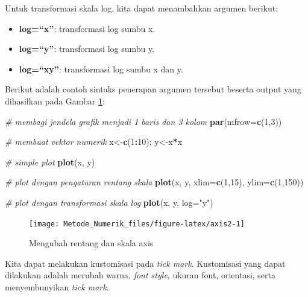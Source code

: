 \documentclass[]{book}
\newenvironment{Shaded}{\begin{snugshade}}{\end{snugshade}}
\newcommand{\CommentTok}[1]{\textcolor[rgb]{0.56,0.35,0.01}{\textit{#1}}}
\newcommand{\DataTypeTok}[1]{\textcolor[rgb]{0.13,0.29,0.53}{#1}}
\newcommand{\DecValTok}[1]{\textcolor[rgb]{0.00,0.00,0.81}{#1}}
\newcommand{\KeywordTok}[1]{\textcolor[rgb]{0.13,0.29,0.53}{\textbf{#1}}}
\newcommand{\NormalTok}[1]{#1}
\newcommand{\OperatorTok}[1]{\textcolor[rgb]{0.81,0.36,0.00}{\textbf{#1}}}
\newcommand{\StringTok}[1]{\textcolor[rgb]{0.31,0.60,0.02}{#1}}
\providecommand{\tightlist}{%
  \setlength{\itemsep}{0pt}\setlength{\parskip}{0pt}}
\theoremstyle{definition}
\theoremstyle{definition}
\theoremstyle{definition}
\theoremstyle{remark}
\begin{document}
Untuk transformasi skala log, kita dapat menambahkan argumen berikut:

\begin{itemize}
\tightlist
\item
  \textbf{log=``x''}: transformasi log sumbu x.
\item
  \textbf{log=``y''}: transformasi log sumbu y.
\item
  \textbf{log=``xy''}: transformasi log sumbu x dan y.
\end{itemize}

Berikut adalah contoh sintaks penerapan argumen tersebut beserta output yang dihasilkan pada Gambar \ref{fig:axis2}:

\begin{Shaded}
\begin{Highlighting}[]
\CommentTok{# membagi jendela grafik menjadi 1 baris dan 3 kolom}
\KeywordTok{par}\NormalTok{(}\DataTypeTok{mfrow=}\KeywordTok{c}\NormalTok{(}\DecValTok{1}\NormalTok{,}\DecValTok{3}\NormalTok{))}

\CommentTok{# membuat vektor numerik}
\NormalTok{x<-}\KeywordTok{c}\NormalTok{(}\DecValTok{1}\OperatorTok{:}\DecValTok{10}\NormalTok{); y<-x}\OperatorTok{*}\NormalTok{x}

\CommentTok{# simple plot}
\KeywordTok{plot}\NormalTok{(x, y)}

\CommentTok{# plot dengan pengaturan rentang skala}
\KeywordTok{plot}\NormalTok{(x, y, }\DataTypeTok{xlim=}\KeywordTok{c}\NormalTok{(}\DecValTok{1}\NormalTok{,}\DecValTok{15}\NormalTok{), }\DataTypeTok{ylim=}\KeywordTok{c}\NormalTok{(}\DecValTok{1}\NormalTok{,}\DecValTok{150}\NormalTok{))}

\CommentTok{# plot dengan transformasi skala log}
\KeywordTok{plot}\NormalTok{(x, y, }\DataTypeTok{log=}\StringTok{"y"}\NormalTok{)}
\end{Highlighting}
\end{Shaded}

\begin{figure}

{\centering \texttt{[image: Metode\_Numerik\_files/figure-latex/axis2-1]} 

}

\caption{Mengubah rentang dan skala axis}\label{fig:axis2}
\end{figure}

Kita dapat melakukan kustomisasi pada \emph{tick mark}. Kustomisasi yang dapat dilakukan adalah merubah warna, \emph{font style}, ukuran font, orientasi, serta menyembunyikan \emph{tick mark}.
\end{document}
